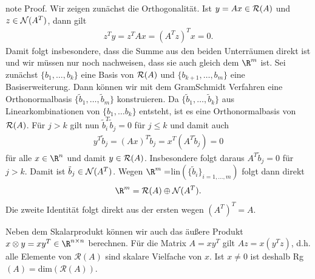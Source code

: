 \documentclass[letterpaper,10pt,english]{jupyterBook}
\begin{document}
\begin{sphinxadmonition}{note}
Proof. Wir zeigen zunächst die Orthogonalität. Ist \(y=Ax \in {\cal R}(A)\) und \(z \in {\cal N}(A^T)\), dann gilt
\begin{equation*}
\begin{split} z^T y = z^T A x = (A^T z)^T x = 0.\end{split}
\end{equation*}
Damit folgt insbesondere, dass die Summe aus den beiden Unterräumen direkt ist und wir müssen nur noch nachweisen, dass sie auch gleich dem \(\R^m\) ist. Sei zunächst \(\{b_1,\ldots,b_k\}\) eine Basis von \({\cal R}(A)\) und \(\{b_{k+1},\ldots,b_m\}\) eine Basiserweiterung. Dann können wir mit dem Gram\sphinxhyphen{}Schmidt Verfahren eine Orthonormalbasis  \(\{\tilde b_1,\ldots, \tilde b_m\}\)
konstruieren. Da \(\{\tilde b_1, \ldots, \tilde b_k\}\) aus Linearkombinationen von \(\{b_1, \ldots b_k\}\) entsteht, ist es eine Orthonormalbasis von \({\cal R}(A)\). Für \(j > k\) gilt nun \(\tilde b_i^T \tilde b_j = 0\) für \(j \leq k\) und damit auch
\begin{equation*}
\begin{split} y^T \tilde b_j = (Ax)^T \tilde b_j = x^T (A^T \tilde b_j) = 0\end{split}
\end{equation*}
für alle \(x \in \R^n\) und damit \(y \in {\cal R}(A)\). Insbesondere folgt daraus \(A^T \tilde b_j = 0\) für \(j > k\). Damit ist \(\tilde b_j \in {\cal N}(A^T)\). Wegen \(\R^m  = \)lin\((\{\tilde b_i\}_{i=1,\ldots,m})\) folgt dann direkt
\begin{equation*}
\begin{split} \R^m  = {\cal R}(A) \oplus {\cal N}(A^T).\end{split}
\end{equation*}
Die zweite Identität folgt direkt aus der ersten wegen \((A^T)^T = A\).
\end{sphinxadmonition}

Neben dem Skalarprodukt können wir auch das äußere Produkt \(x \otimes y = x y^T \in \R^{n \times n}\) berechnen. Für die Matrix \(A=x y^T\) gilt \(A z = x(y^T z)\), d.h. alle Elemente von \({\mathcal R}(A)\) sind skalare Vielfache von \(x\). Ist \(x \neq 0\) ist deshalb Rg\((A) = \)dim\(({\mathcal R}(A))\).
\end{document}
